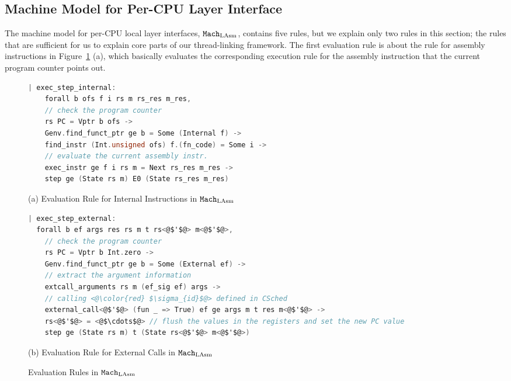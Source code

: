 \subsection{Machine Model for Per-CPU Layer Interface}
\label{chapter:linking:subsec:cpu-local-layer-interface}

The machine model for per-CPU local layer interfaces,
${\mathrm{\texttt{Mach}}}_{\mathrm{LAsm}}$, contains five rules, 
but we explain only two rules in this section; the rules 
that are sufficient for us to explain core parts of our thread-linking framework.
The first evaluation rule is 
about the rule for assembly instructions in Figure~\ref{fig:chapter:linking:eval-rule-in-lasm} (a), 
which basically evaluates the corresponding execution 
rule for the assembly instruction that the current program counter points out. 
\begin{figure}
\begin{lstlisting}[language=C, deletekeywords={unsigned, struct}]
| exec_step_internal:
    forall b ofs f i rs m rs_res m_res,
    // check the program counter
    rs PC = Vptr b ofs ->
    Genv.find_funct_ptr ge b = Some (Internal f) ->
    find_instr (Int.unsigned ofs) f.(fn_code) = Some i ->
    // evaluate the current assembly instr.         
    exec_instr ge f i rs m = Next rs_res m_res ->
    step ge (State rs m) E0 (State rs_res m_res)
\end{lstlisting}
\begin{center}
(a) Evaluation Rule for Internal Instructions in ${\mathrm{\texttt{Mach}}}_{\mathrm{LAsm}}$
\end{center}
\begin{lstlisting}[language=C]
| exec_step_external:
  forall b ef args res rs m t rs<@$'$@> m<@$'$@>,
    // check the program counter  
    rs PC = Vptr b Int.zero ->
    Genv.find_funct_ptr ge b = Some (External ef) ->
    // extract the argument information
    extcall_arguments rs m (ef_sig ef) args ->
    // calling <@\color{red} $\sigma_{id}$@> defined in CSched
    external_call<@$'$@> (fun _ => True) ef ge args m t res m<@$'$@> ->
    rs<@$'$@> = <@$\cdots$@> // flush the values in the registers and set the new PC value
    step ge (State rs m) t (State rs<@$'$@> m<@$'$@>)
\end{lstlisting}
\begin{center}
(b) Evaluation Rule for External Calls in ${\mathrm{\texttt{Mach}}}_{\mathrm{LAsm}}$
\end{center}
\caption{Evaluation Rules in ${\mathrm{\texttt{Mach}}}_{\mathrm{LAsm}}$}
\label{fig:chapter:linking:eval-rule-in-lasm}
\end{figure}

